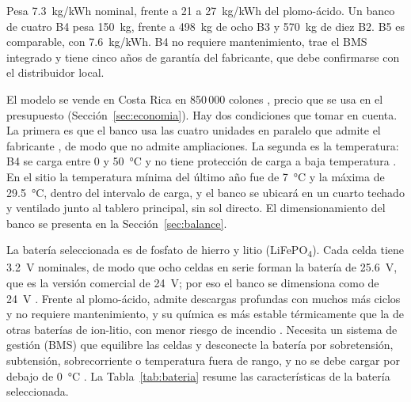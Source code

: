 Pesa \SI{7.3}{kg/kWh} nominal, frente a 21 a \SI{27}{kg/kWh} del plomo-ácido. Un banco de cuatro B4 pesa \SI{150}{kg}, frente a \SI{498}{kg} de ocho B3 y \SI{570}{kg} de diez B2. B5 es comparable, con \SI{7.6}{kg/kWh}. B4 no requiere mantenimiento, trae el BMS integrado y tiene cinco años de garantía del fabricante, que debe confirmarse con el distribuidor local.

El modelo se vende en Costa Rica en 850\,000 colones \cite{kuat}, precio que se usa en el presupuesto (Sección~\ref{sec:economia}). Hay dos condiciones que tomar en cuenta. La primera es que el banco usa las cuatro unidades en paralelo que admite el fabricante \cite{pq_manual}, de modo que no admite ampliaciones. La segunda es la temperatura: B4 se carga entre 0 y \SI{50}{\celsius} y no tiene protección de carga a baja temperatura \cite{pq}. En el sitio la temperatura mínima del último año fue de \SI{7}{\celsius} y la máxima de \SI{29.5}{\celsius}, dentro del intervalo de carga, y el banco se ubicará en un cuarto techado y ventilado junto al tablero principal, sin sol directo. El dimensionamiento del banco se presenta en la Sección~\ref{sec:balance}.

La batería seleccionada es de fosfato de hierro y litio (LiFePO\textsubscript{4}). Cada celda tiene \SI{3.2}{V} nominales, de modo que ocho celdas en serie forman la batería de \SI{25.6}{V}, que es la versión comercial de \SI{24}{V}; por eso el banco se dimensiona como de \SI{24}{V} \cite{linden}. Frente al plomo-ácido, admite descargas profundas con muchos más ciclos y no requiere mantenimiento, y su química es más estable térmicamente que la de otras baterías de ion-litio, con menor riesgo de incendio \cite{zubi2018}. Necesita un sistema de gestión (BMS) que equilibre las celdas y desconecte la batería por sobretensión, subtensión, sobrecorriente o temperatura fuera de rango, y no se debe cargar por debajo de \SI{0}{\celsius} \cite{linden}. La Tabla~\ref{tab:bateria} resume las características de la batería seleccionada.

